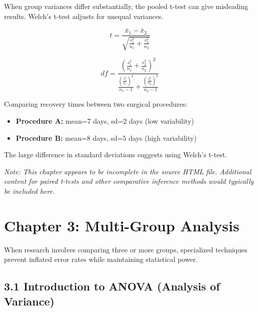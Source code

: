 \documentclass[
  11pt,
  letterpaper,
  oneside]{book}
\providecommand{\tightlist}{%
  \setlength{\itemsep}{0pt}\setlength{\parskip}{0pt}}\usepackage{longtable,booktabs,array}
\begin{document}
When group variances differ substantially, the pooled t-test can give
misleading results. Welch's t-test adjusts for unequal variances.

\[t = \frac{\bar{x}_1 - \bar{x}_2}{\sqrt{\frac{s_1^2}{n_1} + \frac{s_2^2}{n_2}}}\]

\[df = \frac{\left(\frac{s_1^2}{n_1} + \frac{s_2^2}{n_2}\right)^2}{\frac{\left(\frac{s_1^2}{n_1}\right)^2}{n_1-1} + \frac{\left(\frac{s_2^2}{n_2}\right)^2}{n_2-1}}\]

\begin{tcolorbox}[enhanced jigsaw, opacityback=0, opacitybacktitle=0.6, colbacktitle=quarto-callout-tip-color!10!white, toptitle=1mm, colframe=quarto-callout-tip-color-frame, breakable, leftrule=.75mm, left=2mm, titlerule=0mm, bottomtitle=1mm, colback=white, title=\textcolor{quarto-callout-tip-color}{\faLightbulb}\hspace{0.5em}{When Variances Differ}, rightrule=.15mm, coltitle=black, arc=.35mm, bottomrule=.15mm, toprule=.15mm]

Comparing recovery times between two surgical procedures:

\begin{itemize}
\tightlist
\item
  \textbf{Procedure A:} mean=7 days, sd=2 days (low variability)
\item
  \textbf{Procedure B:} mean=8 days, sd=5 days (high variability)
\end{itemize}

The large difference in standard deviations suggests using Welch's
t-test.

\end{tcolorbox}

\emph{Note: This chapter appears to be incomplete in the source HTML
file. Additional content for paired t-tests and other comparative
inference methods would typically be included here.}


\chapter{Chapter 3: Multi-Group
Analysis}\label{chapter-3-multi-group-analysis}

When research involves comparing three or more groups, specialized
techniques prevent inflated error rates while maintaining statistical
power.

\section{3.1 Introduction to ANOVA (Analysis of
Variance)}\label{introduction-to-anova-analysis-of-variance}
\end{document}
